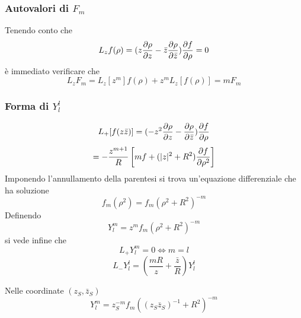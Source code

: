 \subsubsection*{Autovalori di $F_m$}
Tenendo conto che 
\[ L_z f(\rho) = (z\frac{\partial \rho}{\partial z} - \bar{z}\frac{\partial \rho}{\partial \bar{z}}) \frac{\partial f}{\partial \rho} = 0\]
\`e immediato verificare che 
\[ L_z F_m = L_z[z^m] f(\rho) + z^m L_z[f(\rho)] = m F_m\]


\subsubsection*{Forma di $Y_l^l$}
\[ L_+ [f(z\bar{z})] = (-z^2\frac{\partial \rho}{\partial z} - \frac{\partial \rho}{\partial \bar{z}} ) \frac{\partial f}{\partial \rho} \]
\[ = -\frac{z^{m+1}}{R} \left[ mf + (|z|^2+R^2) \frac{\partial f}{\partial \rho^2}   \right] \]
Imponendo l'annullamento della parentesi si trova un'equazione differenziale che ha soluzione
\[ f_m (\rho^2) = f_m(\rho^2 + R^2)^{-m} \]
Definendo 
\[ Y_l^m = z^m f_m(\rho^2 + R^2)^{-m}  \]
si vede infine che 
\[ L_+Y^m_l = 0 \iff m=l \]
\[ L_-Y_l^l = (\frac{mR}{z} +\frac{\bar{z}}{R}) Y_l^l \]

Nelle coordinate $(z_S, \bar{z}_S)$
\[ Y_l^m = z_S^{-m}f_m((z_S\bar{z}_S)^{-1} + R^2)^{-m}  \]


